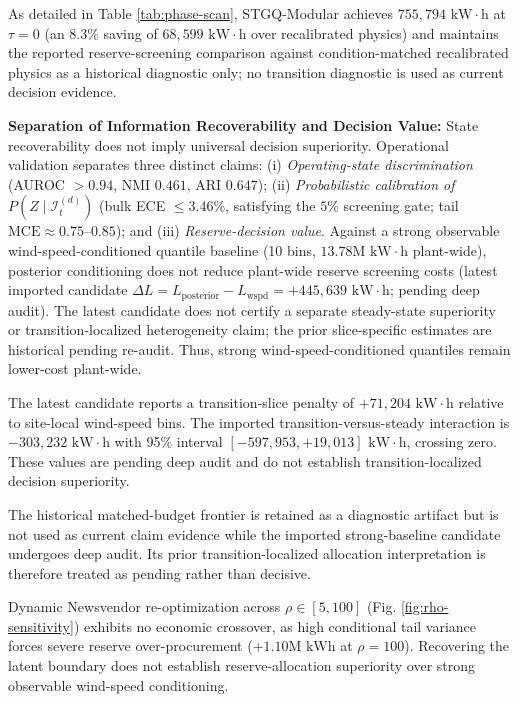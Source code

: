 \documentclass[
  journal]{IEEEtran}
\begin{document}
As detailed in Table \ref{tab:phase-scan}, STGQ-Modular achieves
\(755{,}794\text{ kW}\cdot\text{h}\) at \(\tau=0\) (an \(8.3\%\) saving
of \(68{,}599\text{ kW}\cdot\text{h}\) over recalibrated physics) and
maintains the reported reserve-screening comparison against
condition-matched recalibrated physics as a historical diagnostic only;
no transition diagnostic is used as current decision evidence.

\textbf{Separation of Information Recoverability and Decision Value:}
State recoverability does not imply universal decision superiority.
Operational validation separates three distinct claims: (i)
\textit{Operating-state discrimination} (AUROC \(> 0.94\), NMI
\(0.461\), ARI \(0.647\)); (ii)
\textit{Probabilistic calibration of $P(Z \mid \mathcal{I}_t^{(d)})$}
(bulk ECE \(\le 3.46\%\), satisfying the \(5\%\) screening gate; tail
\(\text{MCE} \approx 0.75\text{--}0.85\)); and (iii)
\textit{Reserve-decision value}. Against a strong observable
wind-speed-conditioned quantile baseline (10 bins,
\(13.78\text{M kW}\cdot\text{h}\) plant-wide), posterior conditioning
does not reduce plant-wide reserve screening costs (latest imported
candidate
\(\Delta L = L_{\text{posterior}} - L_{\text{wspd}} = +445{,}639\text{ kW}\cdot\text{h}\);
pending deep audit). The latest candidate does not certify a separate
steady-state superiority or transition-localized heterogeneity claim;
the prior slice-specific estimates are historical pending re-audit.
Thus, strong wind-speed-conditioned quantiles remain lower-cost
plant-wide.

The latest candidate reports a transition-slice penalty of
\(+71{,}204\text{ kW}\cdot\text{h}\) relative to site-local wind-speed
bins. The imported transition-versus-steady interaction is
\(-303{,}232\text{ kW}\cdot\text{h}\) with 95\% interval
\([-597{,}953, +19{,}013]\text{ kW}\cdot\text{h}\), crossing zero. These
values are pending deep audit and do not establish transition-localized
decision superiority.

The historical matched-budget frontier is retained as a diagnostic
artifact but is not used as current claim evidence while the imported
strong-baseline candidate undergoes deep audit. Its prior
transition-localized allocation interpretation is therefore treated as
pending rather than decisive.

Dynamic Newsvendor re-optimization across \(\rho \in [5, 100]\) (Fig.
\ref{fig:rho-sensitivity}) exhibits no economic crossover, as high
conditional tail variance forces severe reserve over-procurement
(\(+1.10\text{M kWh}\) at \(\rho=100\)). Recovering the latent boundary
does not establish reserve-allocation superiority over strong observable
wind-speed conditioning.
\end{document}
